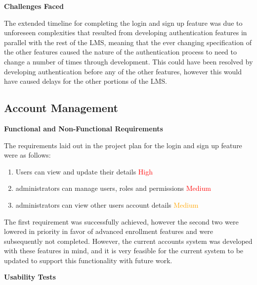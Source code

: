 \textbf{Challenges Faced}

The extended timeline for completing the login and sign up feature was due to unforeseen complexities that resulted from developing authentication features in parallel with the rest of the LMS, meaning that the ever changing specification of the other features caused the nature of the authentication process to need to change a number of times through development. This could have been resolved by developing authentication before any of the other features, however this would have caused delays for the other portions of the LMS.


\subsection{Account Management}
\textbf{Functional and Non-Functional Requirements}

The requirements laid out in the project plan for the login and sign up feature were as follows:
    \begin{enumerate}
    \item Users can view and update their details \textcolor{Red}{High}
    \item administrators can manage users, roles and permissions \textcolor{Red}{Medium}
    \item administrators can view other users account details \textcolor{Orange}{Medium}
    \end{enumerate}
The first requirement was successfully achieved, however the second two were lowered in priority in favor of advanced enrollment features and were subsequently not completed. However, the current accounts system was developed with these features in mind, and it is very feasible for the current system to be updated to support this functionality with future work. 

\textbf{Usability Tests}


